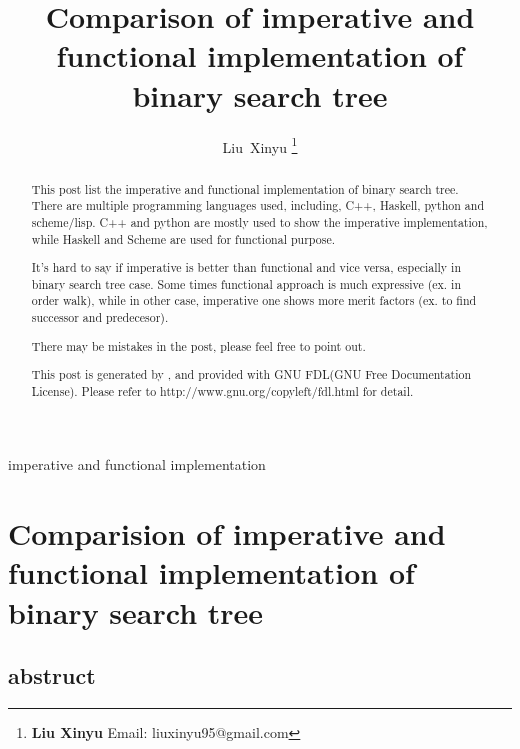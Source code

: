 \documentclass{article}
\begin{document}
\fi


\title{Comparison of imperative and functional implementation of binary search tree}

\author{Liu~Xinyu
\thanks{{\bfseries Liu Xinyu } \newline
  Email: liuxinyu95@gmail.com \newline}
  }

{imperative and functional implementation}

\maketitle

\ifx\wholebook\relax
\chapter{Comparision of imperative and functional implementation of binary search tree}

\section{abstruct}
\else
\begin{abstract}
\fi
This post list the imperative and functional implementation of binary search tree. There are
multiple programming languages used, including, C++, Haskell, python and scheme/lisp.
C++ and python are mostly used to show the imperative implementation, while Haskell and Scheme are
used for functional purpose.

It's hard to say if imperative is better than functional and vice versa, especially in binary search
tree case. Some times functional approach is much expressive (ex. in order walk), while in other case, 
imperative one shows more merit factors (ex. to find successor and predecesor).

There may be mistakes in the post, please feel free to point out.

This post is generated by \LaTeXe, and provided with GNU FDL(GNU Free Documentation License).
Please refer to http://www.gnu.org/copyleft/fdl.html for detail.

\ifx\wholebook\relax\else
\end{abstract}
\fi
\end{document}

